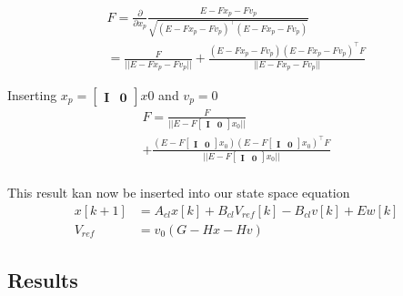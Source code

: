 \begin{align}
    F = \frac{\partial}{\partial x_p} \frac{E-Fx_p-Fv_p}{\sqrt{(E-Fx_p-Fv_p)^\top (E-Fx_p-Fv_p)}} \\
    = \frac{F}{||E-Fx_p-Fv_p||} + \frac{(E-Fx_p-Fv_p)(E-Fx_p-Fv_p)^\top F}{||E-Fx_p-Fv_p||}
\end{align}

Inserting $x_p= \begin{bmatrix}\mathbf{I}  &\mathbf{0}\end{bmatrix}x0$ and $v_p=0$
\begin{multline}
    F= \frac{F}{||E-F  \begin{bmatrix}\mathbf{I}  &\mathbf{0}\end{bmatrix} x_0||} \\+ \frac{(E-F  \begin{bmatrix}\mathbf{I}  &\mathbf{0}\end{bmatrix}x_0)(E-F  \begin{bmatrix}\mathbf{I}  &\mathbf{0}\end{bmatrix}x_0)^\top F}{||E- F \begin{bmatrix}\mathbf{I}  &\mathbf{0}\end{bmatrix}x_0||} \\
\end{multline}

This result kan now be inserted into our state space equation
\begin{align}
 x[k+1] & = A_{cl} x[k] + B_{cl} V_{ref}[k] - B_{cl} v[k] + E w[k] \\
 V_{ref} & = v_0(G- Hx - Hv)
\end{align}
 

\subsection{Results}